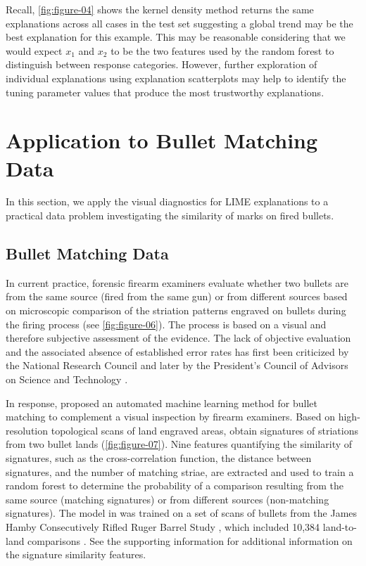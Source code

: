 \documentclass[AMS,STIX2COL]{WileyNJD-v2}\usepackage[]{graphicx}\usepackage[]{color}
\begin{document}
Recall, \autoref{fig:figure-04} shows the kernel density method returns the same explanations across all cases in the test set suggesting a global trend may be the best explanation for this example. This may be reasonable considering that we would expect $x_1$ and $x_2$ to be  the two features used by the random forest to distinguish between response categories. However, further exploration of individual explanations using explanation scatterplots may help to identify the tuning parameter values that produce the most trustworthy explanations.

\section{Application to Bullet Matching Data} \label{application}

In this section, we apply the visual diagnostics for LIME explanations to a practical data problem investigating the similarity of marks on fired bullets.

\subsection{Bullet Matching Data}







In current practice, forensic firearm examiners evaluate whether two bullets are from the same source (fired from the same gun) or from different sources based on microscopic comparison of the striation patterns engraved on bullets during the firing process (see \autoref{fig:figure-06}). The process is based on a visual and therefore subjective assessment of the evidence. The lack of objective evaluation and the associated absence of established error rates has first been criticized by the National Research Council \cite{nrc:2009} and later by the President's Council of Advisors on Science and Technology \cite{pcast:2016}.

In response, \citet{hare:2017} proposed an automated machine learning method for bullet matching to complement a visual inspection by firearm examiners. Based on high-resolution topological scans of land engraved areas, \citet{hare:2017} obtain signatures of striations from two bullet lands (\autoref{fig:figure-07}). Nine features quantifying the similarity of signatures, such as the cross-correlation function, the distance between signatures, and the number of matching striae, are extracted and used to train a random forest to determine the probability of a comparison resulting from the same source (matching signatures) or from different sources (non-matching signatures). The model in \citet{hare:2017} was trained on a set of scans of bullets from the James Hamby Consecutively Rifled Ruger Barrel Study \citep{hamby:2009}, which included 10,384 land-to-land comparisons \citep{hare:2017}. See the supporting information for additional information on the signature similarity features.
\end{document}
